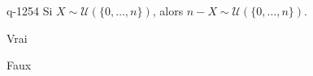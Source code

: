 \begin{truefalse}{q-1254}
Si $X\sim \mathcal{U}(\{0,\ldots,n\})$, alors $n-X\sim \mathcal{U}(\{0,\ldots,n\})$.
\item* Vrai
\item Faux
\end{truefalse}

